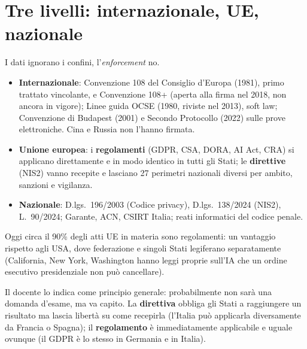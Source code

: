 \section{Tre livelli: internazionale, UE, nazionale}
I dati ignorano i confini, l'\emph{enforcement} no.
\begin{itemize}
  \item \textbf{Internazionale}: Convenzione 108 del Consiglio d'Europa (1981), primo trattato
    vincolante, e Convenzione 108+ (aperta alla firma nel 2018, non ancora in vigore); Linee guida OCSE
    (1980, riviste nel 2013), soft law; Convenzione di Budapest (2001) e Secondo Protocollo (2022) sulle
    prove elettroniche. Cina e Russia non l'hanno firmata.
  \item \textbf{Unione europea}: i \textbf{regolamenti} (GDPR, CSA, DORA, AI Act, CRA) si applicano
    direttamente e in modo identico in tutti gli Stati; le \textbf{direttive} (NIS2) vanno recepite e
    lasciano 27 perimetri nazionali diversi per ambito, sanzioni e vigilanza.
  \item \textbf{Nazionale}: D.lgs.~196/2003 (Codice privacy), D.lgs.~138/2024 (NIS2), L.~90/2024;
    Garante, ACN, CSIRT Italia; reati informatici del codice penale.
\end{itemize}
Oggi circa il 90\% degli atti UE in materia sono regolamenti: un vantaggio rispetto agli USA, dove
federazione e singoli Stati legiferano separatamente (California, New York, Washington hanno leggi
proprie sull'IA che un ordine esecutivo presidenziale non può cancellare).

\begin{nota}
Il docente lo indica come principio generale: probabilmente non sarà una domanda d'esame, ma va
capito. La \textbf{direttiva} obbliga gli Stati a raggiungere un risultato ma lascia libertà su come
recepirla (l'Italia può applicarla diversamente da Francia o Spagna); il \textbf{regolamento} è
immediatamente applicabile e uguale ovunque (il GDPR è lo stesso in Germania e in Italia).
\end{nota}


